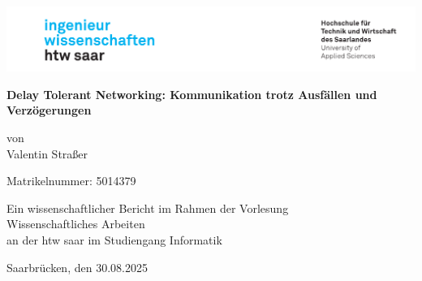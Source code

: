 \begin{titlepage}

\linespread{1.5}

\includegraphics[width=\linewidth]{graphics/htw_logo}

\begin{center}
    \large  
    \hfill
    \vfill
    \Large{\bfseries{Delay Tolerant Networking: Kommunikation trotz Ausfällen und Verzögerungen}}
    
    von \\
    Valentin Straßer

    Matrikelnummer: 5014379

    \vfill
		
    Ein wissenschaftlicher Bericht im Rahmen der Vorlesung\\
    \glqq Wissenschaftliches Arbeiten\grqq\\
    an der htw saar im Studiengang Informatik\\
	
    \vfill	
    \vfill
	
    Saarbrücken, den 30.08.2025
\end{center}
    
\end{titlepage}
